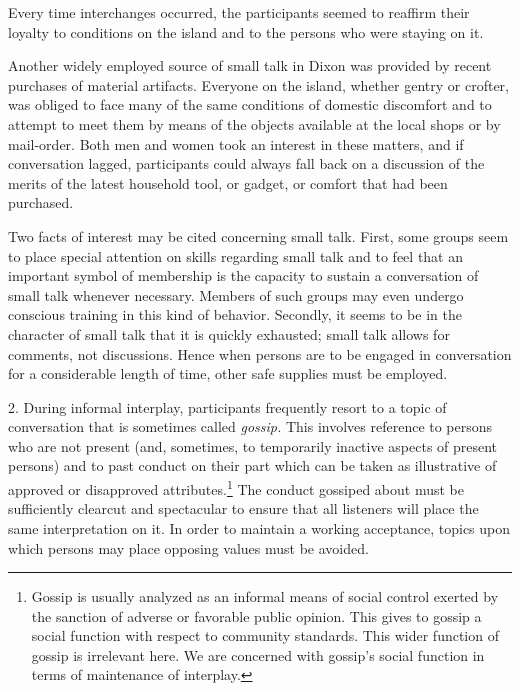 \documentclass[twoside,symmetric,nobib,justified]{tufte-book}
\begin{document}
Every time interchanges occurred, the participants seemed to reaffirm
their loyalty to conditions on the island and to the persons who were
staying on it.

Another widely employed source of small talk in Dixon was provided by
recent purchases of material artifacts. Everyone on the island, whether
gentry or crofter, was obliged to face many of the same conditions of
domestic discomfort and to attempt to meet them by means of the objects
available at the local shops or by mail-order. Both men and women took
an interest in these matters, and if conversation lagged, participants
could always fall back on a discussion of the merits of the latest
household tool, or gadget, or comfort that had been purchased.

Two facts of interest may be cited concerning small talk. First, some
groups seem to place special attention on skills regarding small talk
and to feel that an important symbol of membership is the capacity to
sustain a conversation of small talk whenever necessary. Members of such
groups may even undergo conscious training in this kind of behavior.
Secondly, it seems to be in the character of small talk that it is
quickly exhausted; small talk allows for comments, not discussions.
Hence when persons are to be engaged in conversation for a considerable
length of time, other safe supplies must be employed.

\enlargethispage{\baselineskip}

2. During informal interplay, participants frequently resort to a topic
of conversation that is sometimes called \emph{gossip.} This involves
reference to persons who are not present (and, sometimes, to temporarily
inactive aspects of present persons) and to past conduct on their part
which can be taken as illustrative of approved or disapproved
attributes.\footnote{Gossip is usually analyzed as an informal means of
  social control exerted by the sanction of adverse or favorable public
  opinion. This gives to gossip a social function with respect to
  community standards. This wider function of gossip is irrelevant here.
  We are concerned with gossip's social function in terms of maintenance
  of interplay.} The conduct gossiped about must be sufficiently
clearcut and spectacular to ensure that all listeners will place the
same interpretation on it. In order to maintain a working acceptance,
topics upon which persons may place opposing values must be avoided.
\end{document}
